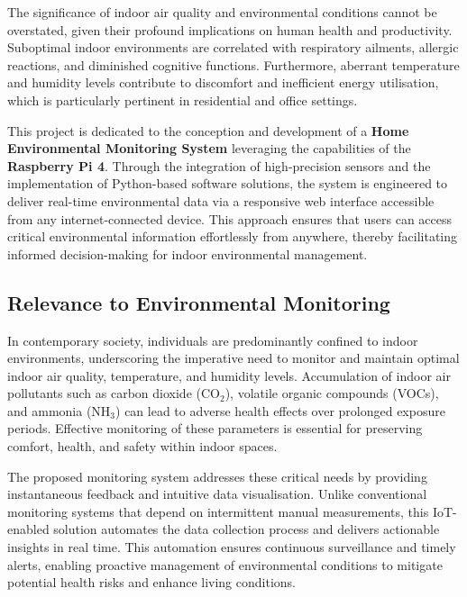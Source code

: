\documentclass[a4paper, 12pt]{report}
\begin{document}
The significance of indoor air quality and environmental conditions cannot be overstated, given their profound implications on human health and productivity. Suboptimal indoor environments are correlated with respiratory ailments, allergic reactions, and diminished cognitive functions. Furthermore, aberrant temperature and humidity levels contribute to discomfort and inefficient energy utilisation, which is particularly pertinent in residential and office settings.

This project is dedicated to the conception and development of a \textbf{Home Environmental Monitoring System} leveraging the capabilities of the \textbf{Raspberry Pi 4}. Through the integration of high-precision sensors and the implementation of Python-based software solutions, the system is engineered to deliver real-time environmental data via a responsive web interface accessible from any internet-connected device. This approach ensures that users can access critical environmental information effortlessly from anywhere, thereby facilitating informed decision-making for indoor environmental management.

\subsection{Relevance to Environmental Monitoring}
In contemporary society, individuals are predominantly confined to indoor environments, underscoring the imperative need to monitor and maintain optimal indoor air quality, temperature, and humidity levels. Accumulation of indoor air pollutants such as carbon dioxide (CO$_2$), volatile organic compounds (VOCs), and ammonia (NH$_3$) can lead to adverse health effects over prolonged exposure periods. Effective monitoring of these parameters is essential for preserving comfort, health, and safety within indoor spaces.

The proposed monitoring system addresses these critical needs by providing instantaneous feedback and intuitive data visualisation. Unlike conventional monitoring systems that depend on intermittent manual measurements, this IoT-enabled solution automates the data collection process and delivers actionable insights in real time. This automation ensures continuous surveillance and timely alerts, enabling proactive management of environmental conditions to mitigate potential health risks and enhance living conditions.
\end{document}
